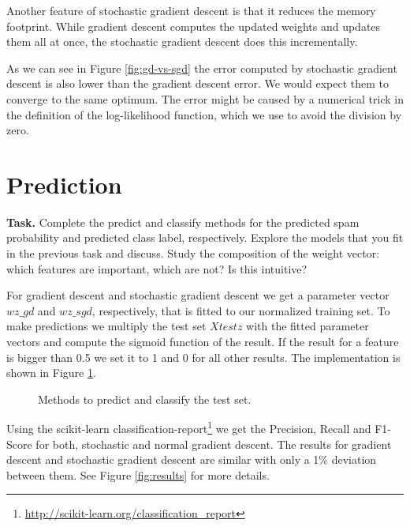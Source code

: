 \documentclass{support/acm_proc_article-sp}
\begin{document}
    Another feature of stochastic gradient descent is that it reduces the memory footprint.
    While gradient descent computes the updated weights and updates them all at once, the stochastic gradient descent
    does this incrementally.

    As we can see in Figure \ref{fig:gd-vs-sgd} the error computed by stochastic gradient descent is also lower than the
    gradient descent error.
    We would expect them to converge to the same optimum.
    The error might be caused by a numerical trick in the definition of the log-likelihood function, which we use to avoid
    the division by zero.


    \section{Prediction}
    \vspace{\baselineskip}

    \textbf{Task.}
    Complete the predict and classify methods for the predicted spam probability and predicted class label, respectively.
    Explore the models that you fit in the previous task and discuss.
    Study the composition of the weight vector: which features are important, which are not?
    Is this intuitive?

    For gradient descent and stochastic gradient descent we get a parameter vector $wz\_gd$ and $wz\_sgd$, respectively,
    that is fitted to our normalized training set.
    To make predictions we multiply the test set $Xtestz$ with the fitted parameter vectors and compute the sigmoid function
    of the result.
    If the result for a feature is bigger than 0.5 we set it to 1 and 0 for all other results.
    The implementation is shown in Figure \ref{fig:predict-classify}.
    \begin{figure}[htbp]
        \centering
        \lstset{numbers=none,xleftmargin=0em}
        
        \caption{Methods to predict and classify the test set.}
        \label{fig:predict-classify}
    \end{figure}
    Using the scikit-learn classification-report\footnote{\href{http://scikit-learn.org/stable/modules/generated/sklearn.metrics.classification_report.html}{http://scikit-learn.org/classification\_report}}
    we get the Precision, Recall and F1-Score for both, stochastic and normal gradient descent.
    The results for gradient descent and stochastic gradient descent are similar with only a 1\% deviation between them.
    See Figure \ref{fig:results} for more details.
\end{document}
